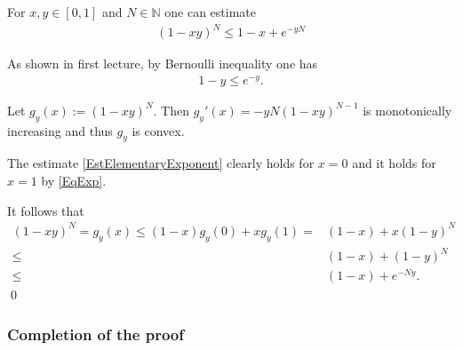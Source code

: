\begin{frame}
\begin{lemma}
For $x,y\in [0,1]$ and $N\in\mathbb{N}$ one can estimate
\begin{align}\label{EstElementaryExponent}
(1-xy)^N\leq 1-x+e^{-yN}
\end{align}
\end{lemma} 
\bit
\item As shown in first lecture, by Bernoulli inequality one has
\begin{align}\label{EqExp}
1-y\leq e^{-y}.
\end{align}
\item Let $g_y(x):=(1-xy)^N$. Then $g_y'(x)=-yN(1-xy)^{N-1}$ is monotonically increasing and thus $g_y$ is convex.  
\item The estimate \eqref{EstElementaryExponent} clearly holds for $x=0$ and it holds for $x=1$ by \eqref{EqExp}. 
\item It follows that 
\begin{align*}
(1-xy)^N=g_y(x)\leq (1-x)g_y(0)+xg_y(1) = &(1-x)+x(1-y)^N\\ \leq &(1-x)+(1-y)^N\\ \leq &(1-x)+e^{-Ny}. 
\end{align*}
\qed
\eit
\end{frame}


\subsubsection{Completion of the proof}

